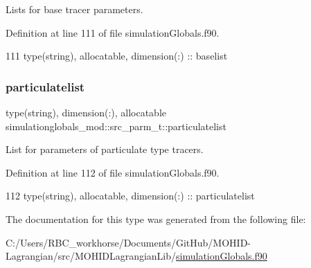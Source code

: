Lists for base tracer parameters. 



Definition at line 111 of file simulation\+Globals.\+f90.


\begin{DoxyCode}
111         \textcolor{keywordtype}{type}(string), \textcolor{keywordtype}{allocatable}, \textcolor{keywordtype}{dimension(:)} :: baselist
\end{DoxyCode}
\mbox{\label{structsimulationglobals__mod_1_1src__parm__t_acc2c392a2031552a1f44336a4ca96873}} 
\subsubsection{\texorpdfstring{particulatelist}{particulatelist}}
{\footnotesize\ttfamily type(string), dimension(\+:), allocatable simulationglobals\+\_\+mod\+::src\+\_\+parm\+\_\+t\+::particulatelist\hspace{0.3cm}{\ttfamily [private]}}



List for parameters of particulate type tracers. 



Definition at line 112 of file simulation\+Globals.\+f90.


\begin{DoxyCode}
112         \textcolor{keywordtype}{type}(string), \textcolor{keywordtype}{allocatable}, \textcolor{keywordtype}{dimension(:)} :: particulatelist
\end{DoxyCode}


The documentation for this type was generated from the following file\+:\begin{DoxyCompactItemize}
\item 
C\+:/\+Users/\+R\+B\+C\+\_\+workhorse/\+Documents/\+Git\+Hub/\+M\+O\+H\+I\+D-\/\+Lagrangian/src/\+M\+O\+H\+I\+D\+Lagrangian\+Lib/\mbox{\hyperlink{simulation_globals_8f90}{simulation\+Globals.\+f90}}\end{DoxyCompactItemize}
